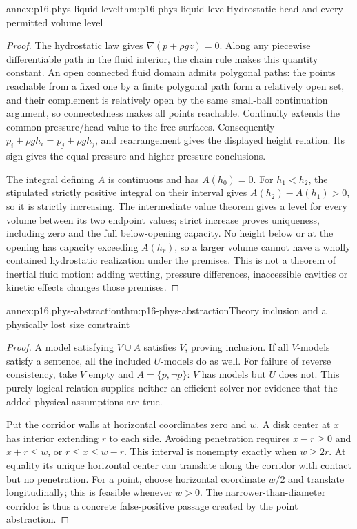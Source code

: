 \begin{annexitem}{annex:p16.phys-liquid-level}{thm:p16-phys-liquid-level}{Hydrostatic head and every permitted volume level}
\begin{proof}
The hydrostatic law gives \(\nabla(p+\rho gz)=0\). Along any piecewise
differentiable path in the fluid interior, the chain rule makes this
quantity constant. An open connected fluid domain admits polygonal paths:
the points reachable from a fixed one by a finite polygonal path form
a relatively open set, and their complement is relatively open by the
same small-ball continuation argument, so connectedness makes all points
reachable. Continuity extends the common pressure/head value to the free
surfaces. Consequently \(p_i+\rho gh_i=p_j+\rho gh_j\), and
rearrangement gives the displayed height relation. Its sign gives the
equal-pressure and higher-pressure conclusions.

The integral defining \(A\) is continuous and has \(A(h_0)=0\).
For \(h_1<h_2\), the stipulated strictly positive integral on their
interval gives \(A(h_2)-A(h_1)>0\), so it is strictly increasing.
The intermediate value theorem gives a level for every volume between
its two endpoint values; strict increase proves uniqueness, including
zero and the full below-opening capacity. No height below or at the
opening has capacity exceeding \(A(h_r)\), so a larger volume cannot
have a wholly contained hydrostatic realization under the premises.
This is not a theorem of inertial fluid motion: adding wetting, pressure
differences, inaccessible cavities or kinetic effects changes those premises.
\end{proof}
\end{annexitem}

\begin{annexitem}{annex:p16.phys-abstraction}{thm:p16-phys-abstraction}{Theory inclusion and a physically lost size constraint}
\begin{proof}
A model satisfying \(V\cup A\) satisfies \(V\), proving inclusion.
If all \(V\)-models satisfy a sentence, all the included \(U\)-models
do as well. For failure of reverse consistency, take \(V\) empty and
\(A=\{p,\neg p\}\): \(V\) has models but \(U\) does not.
This purely logical relation supplies neither an efficient solver nor
evidence that the added physical assumptions are true.

Put the corridor walls at horizontal coordinates zero and \(w\).
A disk center at \(x\) has interior extending \(r\) to each side.
Avoiding penetration requires \(x-r\ge0\) and \(x+r\le w\),
or \(r\le x\le w-r\). This interval is nonempty exactly when
\(w\ge2r\). At equality its unique horizontal center can translate
along the corridor with contact but no penetration. For a point, choose
horizontal coordinate \(w/2\) and translate longitudinally; this is
feasible whenever \(w>0\). The narrower-than-diameter corridor is thus
a concrete false-positive passage created by the point abstraction.
\end{proof}
\end{annexitem}

